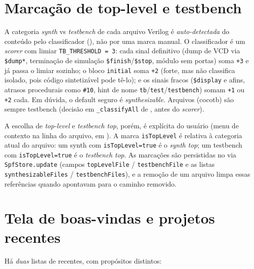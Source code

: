 \section{Marcação de top-level e testbench}

A categoria \emph{synth} vs \emph{testbench} de cada arquivo Verilog é
\emph{auto-detectada} do conteúdo pelo classificador
(), não por uma marca manual. O
classificador é um \emph{scorer} com limiar \lstinline|TB_THRESHOLD = 3|: cada
sinal definitivo (dump de VCD via \lstinline|$dump*|, terminação de simulação
\lstinline|$finish|/\lstinline|$stop|, módulo sem portas) soma \lstinline|+3| e
já passa o limiar sozinho; o bloco \lstinline|initial| soma \lstinline|+2|
(forte, mas não classifica isolado, pois código sintetizável pode tê-lo); e os
sinais fracos (\lstinline|$display| e afins, atrasos procedurais como
\lstinline|#10|, hint de nome \lstinline|tb|/\lstinline|test|/\lstinline|testbench|)
somam \lstinline|+1| ou \lstinline|+2| cada. Em dúvida, o default seguro é
\emph{synthesizable}. Arquivos  (cocotb) são sempre testbench
(decisão em \lstinline|_classifyAll| de , antes do
\emph{scorer}).

A escolha de \emph{top-level} e \emph{testbench top}, porém, é explícita do
usuário (menu de contexto na linha do arquivo, em ).
A marca \lstinline|isTopLevel| é relativa à categoria atual do arquivo: um synth
com \lstinline|isTopLevel=true| é o \emph{synth top}; um testbench com
\lstinline|isTopLevel=true| é o \emph{testbench top}. As marcações são
persistidas no  via \lstinline|SpfStore.update| (campos
\lstinline|topLevelFile| / \lstinline|testbenchFile| e as listas
\lstinline|synthesizableFiles| / \lstinline|testbenchFiles|), e a remoção de um
arquivo limpa essas referências quando apontavam para o caminho removido.

\section{Tela de boas-vindas e projetos recentes}
\label{sec:recentes}

Há \emph{duas} listas de recentes, com propósitos distintos:

